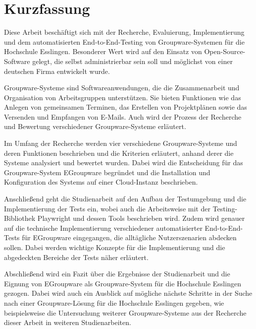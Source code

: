 \chapter{Kurzfassung}

Diese Arbeit beschäftigt sich mit der Recherche, Evaluierung, Implementierung und dem automatisierten End-to-End-Testing von Groupware-Systemen für die Hochschule Esslingen.
Besonderer Wert wird auf den Einsatz von Open-Source-Software gelegt, die selbst administrierbar sein soll und möglichst von einer deutschen Firma entwickelt wurde.

Groupware-Systeme sind Softwareanwendungen, die die Zusammenarbeit und Organisation von Arbeitsgruppen unterstützen.
Sie bieten Funktionen wie das Anlegen von gemeinsamen Terminen, das Erstellen von Projektplänen sowie das Versenden und Empfangen von E-Mails.
Auch wird der Prozess der Recherche und Bewertung verschiedener Groupware-Systeme erläutert.

Im Umfang der Recherche werden vier verschiedene Groupware-Systeme und deren Funktionen beschrieben und die Kriterien erläutert, anhand derer die Systeme analysiert und bewertet wurden.
Dabei wird die Entscheidung für das Groupware-System EGroupware begründet und die Installation und Konfiguration des Systems auf einer Cloud-Instanz beschrieben.

Anschließend geht die Studienarbeit auf den Aufbau der Testumgebung und die Implementierung der Tests ein, wobei auch die Arbeitsweise mit der Testing-Bibliothek Playwright und dessen Tools beschrieben wird.
Zudem wird genauer auf die technische Implementierung verschiedener automatisierter End-to-End-Tests für EGroupware eingegangen, die alltägliche Nutzerszenarien abdecken sollen.
Dabei werden wichtige Konzepte für die Implementierung und die abgedeckten Bereiche der Tests näher erläutert.

Abschließend wird ein Fazit über die Ergebnisse der Studienarbeit und die Eignung von EGroupware als Groupware-System für die Hochschule Esslingen gezogen.
Dabei wird auch ein Ausblick auf mögliche nächste Schritte in der Suche nach einer Groupware-Lösung für die Hochschule Esslingen gegeben, wie beispielsweise die Untersuchung weiterer Groupware-Systeme aus der Recherche dieser Arbeit in weiteren Studienarbeiten.